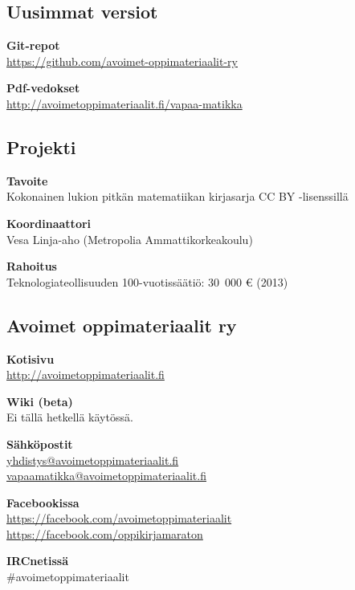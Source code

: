 \subsection*{Uusimmat versiot}

\textbf{Git-repot} \\
\url{https://github.com/avoimet-oppimateriaalit-ry}

\textbf{Pdf-vedokset} \\
\url{http://avoimetoppimateriaalit.fi/vapaa-matikka}

\subsection*{Projekti}

\textbf{Tavoite} \\
Kokonainen lukion pitkän matematiikan kirjasarja CC BY -lisenssillä

\textbf{Koordinaattori} \\
Vesa Linja-aho (Metropolia Ammattikorkeakoulu)

\textbf{Rahoitus} \\
Teknologiateollisuuden 100-vuotissäätiö: 30~000 \euro \; (2013)

\subsection*{Avoimet oppimateriaalit ry}

\textbf{Kotisivu} \\
\url{http://avoimetoppimateriaalit.fi}

\textbf{Wiki (beta)} \\
Ei tällä hetkellä käytössä.

\textbf{Sähköpostit} \\
\href{mailto:yhdistys@avoimetoppimateriaalit.fi}{yhdistys@avoimetoppimateriaalit.fi} \\
\href{mailto:vapaamatikka@avoimetoppimateriaalit.fi}{vapaamatikka@avoimetoppimateriaalit.fi}

\textbf{Facebookissa} \\
\url{https://facebook.com/avoimetoppimateriaalit} \\
\url{https://facebook.com/oppikirjamaraton}

\textbf{IRCnetissä} \\
\#avoimetoppimateriaalit

